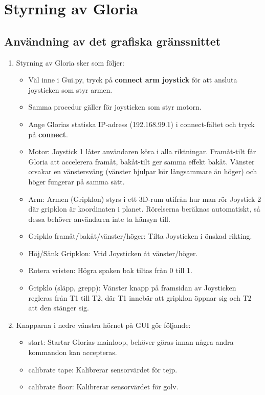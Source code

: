 \section{Styrning av Gloria}

\subsection{Användning av det grafiska gränssnittet}
\begin{enumerate}
	\item Styrning av Gloria sker som följer: 
	\begin{itemize}
		\item Väl inne i Gui.py, tryck på \textbf{connect arm joystick} för att ansluta joysticken som styr armen.
		\item Samma procedur gäller för joysticken som styr motorn.
		\item Ange Glorias statiska IP-adress (192.168.99.1) i connect-fältet och tryck på \textbf{connect}.
		\item Motor: Joystick 1 låter användaren köra i alla riktningar. Framåt-tilt får Gloria att accelerera framåt, bakåt-tilt ger samma effekt bakåt. Vänster orsakar en vänstersväng (vänster hjulpar kör långsammare än höger) och höger fungerar på samma sätt.
		\item Arm: Armen (Gripklon) styrs i ett 3D-rum utifrån hur man rör Joystick 2 där gripklon är koordinaten i planet. Rörelserna beräknas automatiskt, så dessa behöver användaren inte ta hänsyn till. 
		\item Gripklo framåt/bakåt/vänster/höger: Tilta Joysticken i önskad rikting.
		\item Höj/Sänk Gripklon: Vrid Joysticken åt vänster/höger.
		\item Rotera vristen: Högra spaken bak tiltas från 0 till 1.
		\item Gripklo (släpp, grepp): Vänster knapp på framsidan av Joysticken regleras från T1 till T2, där T1 innebär att gripklon öppnar sig och T2 att den stänger sig.
	\end{itemize}
	\item Knapparna i nedre vänstra hörnet på GUI gör följande:
	\begin{itemize}
		\item start: Startar Glorias mainloop, behöver göras innan några andra kommandon kan accepteras.
		\item calibrate tape: Kalibrerar sensorvärdet för tejp.
		\item calibrate floor: Kalibrerar sensorvärdet för golv.

\end{itemize}
\end{enumerate}
